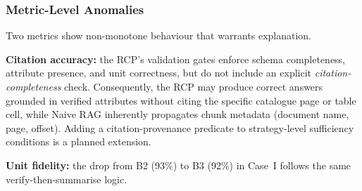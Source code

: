 \documentclass[largeformat]{interact}
\begin{document}
\subsubsection{Metric-Level Anomalies}
\label{subsubsection:metric_anomalies}
Two metrics show non-monotone behaviour that warrants explanation. 

\textbf{Citation accuracy:} the RCP's validation gates enforce schema completeness, attribute presence, and unit correctness, but do not include an explicit \emph{citation-completeness} check. Consequently, the RCP may produce correct answers grounded in verified attributes without citing the specific catalogue page or table cell, while Naive RAG inherently propagates chunk metadata (document name, page, offset). Adding a citation-provenance predicate to strategy-level sufficiency conditions is a planned extension. 

\textbf{Unit fidelity:} the drop from B2 (93\%) to B3 (92\%) in Case~I follows the same verify-then-summarise logic.
\end{document}
